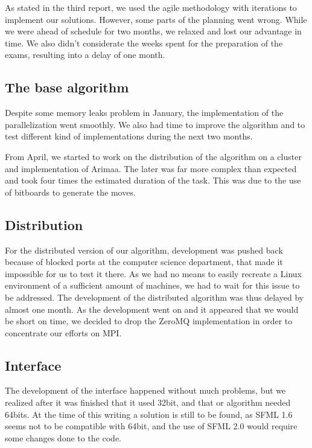 As stated in the third report, we used the agile methodology with iterations to implement our solutions. However, some parts of the planning went wrong. While we were ahead of schedule for two months, we relaxed and lost our advantage in time. We also didn't considerate the weeks spent for the preparation of the exams, resulting into a delay of one month.

\subsection{The base algorithm}
Despite some memory leaks problem in January, the implementation of the parallelization went smoothly. We also had time to improve the algorithm and to test different kind of implementations during the next two months.

From April, we started to work on the distribution of the algorithm on a cluster and implementation of Arimaa. The later was far more complex than expected and took four times the estimated duration of the task. This was due to the use of bitboards to generate the moves.

\subsection{Distribution}
For the distributed version of our algorithm, development was pushed back because of blocked ports at the computer science department, that made it impossible for us to test it there.
As we had no means to easily recreate a Linux environment of a sufficient amount of machines, we had to wait for this issue to be addressed. The development of the distributed algorithm was thus delayed by almost one month.
As the development went on and it appeared that we would be short on time, we decided to drop the ZeroMQ implementation in order to concentrate our efforts on MPI.

\subsection{Interface}
The development of the interface happened without much problems, but we realized after it was finished that it used 32bit, and that or algorithm needed 64bits.
At the time of this writing a solution is still to be found, as SFML 1.6 seems not to be compatible with 64bit, and the use of SFML 2.0 would require some changes done to the code.